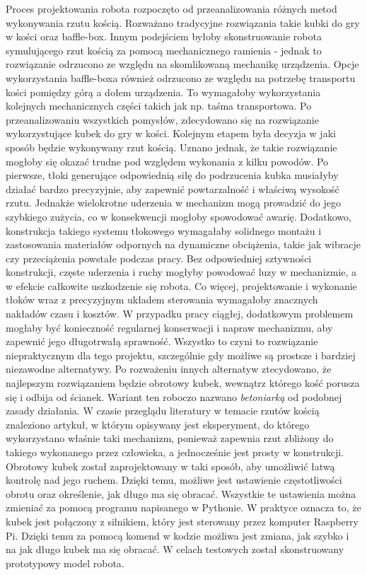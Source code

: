 Proces projektowania robota rozpoczęto od przeanalizowania różnych metod wykonywania rzutu kością. Rozważano tradycyjne rozwiązania takie kubki do gry w kości oraz baffle-box.
Innym podejściem byłoby skonstruowanie robota symulującego rzut kością za pomocą mechanicznego ramienia - jednak to rozwiązanie odrzucono ze względu na 
skomlikowaną mechanikę urządzenia. Opcje wykorzystania baffle-boxa również odrzucono ze względu na potrzebę transportu kości pomiędzy górą a dołem urządzenia. To wymagałoby
wykorzystania kolejnych mechanicznych części takich jak np. taśma transportowa.
Po przeanalizowaniu wszystkich pomysłów, zdecydowano się na rozwiązanie wykorzystujące kubek do gry w kości. Kolejnym etapem była decyzja w jaki sposób 
będzie wykonywany rzut kością. Uznano jednak, że takie rozwiązanie mogłoby się okazać trudne pod względem wykonania z kilku powodów. Po pierwsze, tłoki 
generujące odpowiednią siłę do podrzucenia kubka musiałyby działać bardzo precyzyjnie, aby zapewnić powtarzalność i właściwą wysokość rzutu. Jednakże 
wielokrotne uderzenia w mechanizm mogą prowadzić do jego szybkiego zużycia, co w konsekwencji mogłoby spowodować awarię.
Dodatkowo, konstrukcja takiego systemu tłokowego wymagałaby solidnego montażu i zastosowania materiałów odpornych na dynamiczne obciążenia, takie jak 
wibracje czy przeciążenia powstałe podczas pracy. Bez odpowiedniej sztywności konstrukcji, częste uderzenia i ruchy mogłyby powodować luzy w mechanizmie, 
a w efekcie całkowite uszkodzenie się robota.
Co więcej, projektowanie i wykonanie tłoków wraz z precyzyjnym układem sterowania wymagałoby znacznych nakładów czasu i kosztów. W przypadku pracy 
ciągłej, dodatkowym problemem mogłaby być konieczność regularnej konserwacji i napraw mechanizmu, aby zapewnić jego długotrwałą sprawność. Wszystko to 
czyni to rozwiązanie niepraktycznym dla tego projektu, szczególnie gdy możliwe są prostsze i bardziej niezawodne alternatywy. Po rozważeniu innych alternatyw
ztecydowano, że najlepszym rozwiązaniem będzie obrotowy kubek, wewnątrz którego kość porusza się i odbija od ścianek. Wariant ten roboczo nazwano \textit{betoniarką} od podobnej 
zasady działania. W czasie przeglądu literatury w temacie rzutów kością znaleziono artykuł, w którym opisywany jest eksperyment, do którego wykorzystano właśnie taki 
mechanizm, ponieważ zapewnia rzut zbliżony do takiego wykonanego przez człowieka, a jednocześnie jest prosty w konstrukcji. \cite{PK} Obrotowy kubek został zaprojektowany w taki 
sposób, aby umożliwić łatwą kontrolę nad jego ruchem. Dzięki temu, możliwe jest ustawienie częstotliwości obrotu oraz określenie, jak długo ma się obracać. Wszystkie te ustawienia 
można zmieniać za pomocą programu napisanego w Pythonie. W praktyce oznacza to, że kubek jest połączony z silnikiem, który jest sterowany przez komputer 
Raspberry Pi. Dzięki temu za pomocą komend w kodzie możliwa jest zmiana, jak szybko i na jak długo kubek ma się obracać.
W celach testowych został skonstruowany prototypowy model robota.

